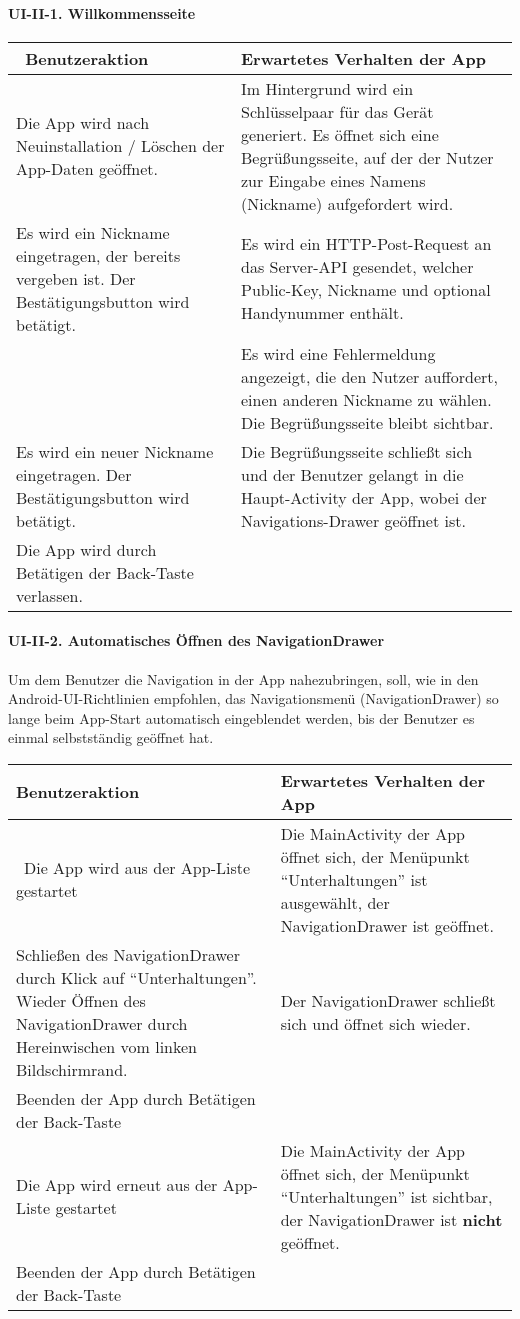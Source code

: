 \paragraph{UI-II-1. Willkommensseite}\label{willkommensseite}

\begin{longtable}{|p{8cm}|p{8.5cm}|}
\hline
~Benutzeraktion & Erwartetes Verhalten der App\tabularnewline
\hline

Die App wird nach Neuinstallation / Löschen der App-Daten geöffnet. & Im
Hintergrund wird ein Schlüsselpaar für das Gerät generiert. Es öffnet
sich eine Begrüßungsseite, auf der der Nutzer zur Eingabe eines Namens
(Nickname) aufgefordert wird.\tabularnewline
Es wird ein Nickname eingetragen, der bereits vergeben ist. Der
Bestätigungsbutton wird betätigt. & Es wird ein HTTP-Post-Request an das
Server-API gesendet, welcher Public-Key, Nickname und optional
Handynummer enthält.\tabularnewline
~ & Es wird eine Fehlermeldung angezeigt, die den Nutzer auffordert,
einen anderen Nickname zu wählen. Die Begrüßungsseite bleibt
sichtbar.\tabularnewline
Es wird ein neuer Nickname eingetragen. Der Bestätigungsbutton wird
betätigt. & Die Begrüßungsseite schließt sich und der Benutzer gelangt
in die Haupt-Activity der App, wobei der Navigations-Drawer geöffnet
ist.\tabularnewline
Die App wird durch Betätigen der Back-Taste verlassen. &\tabularnewline
\hline
\end{longtable}

\paragraph{UI-II-2. Automatisches Öffnen des
NavigationDrawer}\label{automatisches-uxf6ffnen-des-navigationdrawer}

Um dem Benutzer die Navigation in der App nahezubringen, soll, wie in
den Android-UI-Richtlinien empfohlen, das Navigationsmenü
(NavigationDrawer) so lange beim App-Start automatisch eingeblendet
werden, bis der Benutzer es einmal selbstständig geöffnet hat.

\begin{longtable}{|p{8cm}|p{8.5cm}|}
\hline
Benutzeraktion & Erwartetes Verhalten der App\tabularnewline
\hline

~Die App wird aus der App-Liste gestartet & Die MainActivity der App
öffnet sich, der Menüpunkt ``Unterhaltungen'' ist ausgewählt, der
NavigationDrawer ist geöffnet.\tabularnewline
Schließen des NavigationDrawer durch Klick auf ``Unterhaltungen''.
Wieder Öffnen des NavigationDrawer durch Hereinwischen vom linken
Bildschirmrand. & Der NavigationDrawer schließt sich und öffnet sich
wieder.\tabularnewline
Beenden der App durch Betätigen der Back-Taste &\tabularnewline
Die App wird erneut aus der App-Liste gestartet & Die MainActivity der
App öffnet sich, der Menüpunkt ``Unterhaltungen'' ist sichtbar, der
NavigationDrawer ist \textbf{nicht} geöffnet.\tabularnewline
Beenden der App durch Betätigen der Back-Taste &\tabularnewline
\hline
\end{longtable}

